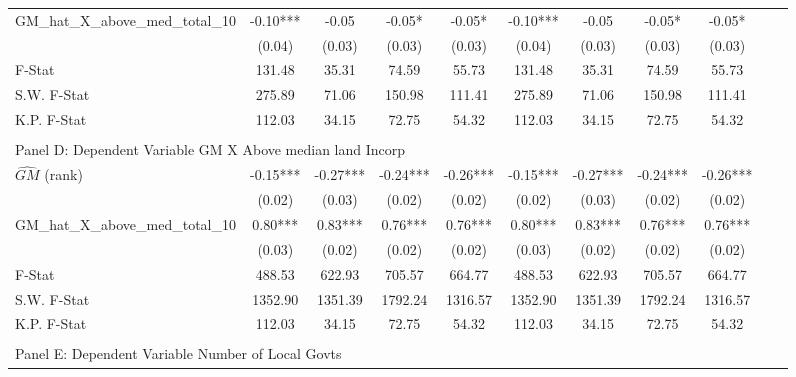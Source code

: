 \begin{table}[htbp]
\begin{threeparttable}
\begin{tabular}{l*{10}{c}}
\addlinespace
GM\_hat\_X\_above\_med\_total\_10&      -0.10***&      -0.05   &      -0.05*  &      -0.05*  &      -0.10***&      -0.05   &      -0.05*  &      -0.05*  \\
                &     (0.04)   &     (0.03)   &     (0.03)   &     (0.03)   &     (0.04)   &     (0.03)   &     (0.03)   &     (0.03)   \\
\midrule
F-Stat          &     131.48   &      35.31   &      74.59   &      55.73   &     131.48   &      35.31   &      74.59   &      55.73   \\
S.W. F-Stat     &     275.89   &      71.06   &     150.98   &     111.41   &     275.89   &      71.06   &     150.98   &     111.41   \\
K.P. F-Stat     &     112.03   &      34.15   &      72.75   &      54.32   &     112.03   &      34.15   &      72.75   &      54.32   \\
\cmidrule[\heavyrulewidth](lr){1-9} \\ \cmidrule[\heavyrulewidth](lr){1-9}
\multicolumn{8}{l}{Panel D: Dependent Variable GM X Above median land Incorp}\\
\cmidrule(lr){1-9}
$\hat{GM}$ (rank)&      -0.15***&      -0.27***&      -0.24***&      -0.26***&      -0.15***&      -0.27***&      -0.24***&      -0.26***\\
                &     (0.02)   &     (0.03)   &     (0.02)   &     (0.02)   &     (0.02)   &     (0.03)   &     (0.02)   &     (0.02)   \\
\addlinespace
GM\_hat\_X\_above\_med\_total\_10&       0.80***&       0.83***&       0.76***&       0.76***&       0.80***&       0.83***&       0.76***&       0.76***\\
                &     (0.03)   &     (0.02)   &     (0.02)   &     (0.02)   &     (0.03)   &     (0.02)   &     (0.02)   &     (0.02)   \\
\midrule
F-Stat          &     488.53   &     622.93   &     705.57   &     664.77   &     488.53   &     622.93   &     705.57   &     664.77   \\
S.W. F-Stat     &    1352.90   &    1351.39   &    1792.24   &    1316.57   &    1352.90   &    1351.39   &    1792.24   &    1316.57   \\
K.P. F-Stat     &     112.03   &      34.15   &      72.75   &      54.32   &     112.03   &      34.15   &      72.75   &      54.32   \\
\cmidrule[\heavyrulewidth](lr){1-9} \\ \cmidrule[\heavyrulewidth](lr){1-9}
\multicolumn{8}{l}{Panel E: Dependent Variable Number of Local Govts}\\

\end{tabular}
\end{threeparttable}
\end{table}
